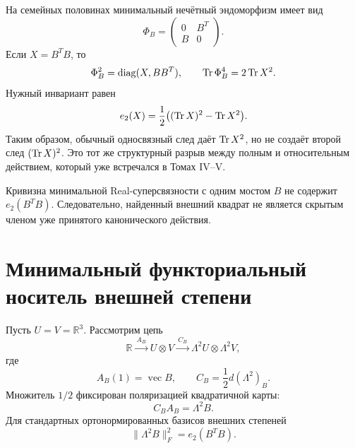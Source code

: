 На семейных половинах минимальный нечётный эндоморфизм имеет вид
\begin{equation}
 \Phi_B=
 \begin{pmatrix}0&B^T\\B&0\end{pmatrix}.
\end{equation}
Если $X=B^TB$, то
\begin{equation}
 \Phi_B^2=\operatorname{diag}(X,BB^T),
 \qquad
 \operatorname{Tr}\Phi_B^4=2\operatorname{Tr} X^2.
 \label{eq:v6-two-node-bridge-trace-four}
\end{equation}
Нужный инвариант равен
\begin{equation}
 e_2(X)=\frac12\bigl((\operatorname{Tr} X)^2-\operatorname{Tr} X^2\bigr).
\end{equation}
Таким образом, обычный односвязный след даёт $\operatorname{Tr} X^2$, но не создаёт
второй след $(\operatorname{Tr} X)^2$. Это тот же структурный разрыв между полным и
относительным действием, который уже встречался в Томах IV--V.

\begin{theorem}
Кривизна минимальной Real-суперсвязности с одним мостом $B$ не содержит
$e_2(B^TB)$. Следовательно, найденный внешний квадрат не является
скрытым членом уже принятого канонического действия.
\end{theorem}

\section{Минимальный функториальный носитель внешней степени}

Пусть $U=V=\mathbb R^3$. Рассмотрим цепь
\begin{equation}
 \mathbb R
 \xrightarrow{\ A_B\ }
 U\otimes V
 \xrightarrow{\ C_B\ }
 \Lambda^2U\otimes\Lambda^2V,
 \label{eq:v6-bridge-exterior-chain}
\end{equation}
где
\begin{equation}
 A_B(1)=\operatorname{vec}B,
 \qquad
 C_B=\frac12d(\Lambda^2)_B.
\end{equation}
Множитель $1/2$ фиксирован поляризацией квадратичной карты:
\begin{equation}
 C_BA_B=\Lambda^2B.
 \label{eq:v6-polarized-exterior-path}
\end{equation}
Для стандартных ортонормированных базисов внешних степеней
\begin{equation}
 \|\Lambda^2B\|_F^2=e_2(B^TB).
 \label{eq:v6-normalized-exterior-norm}
\end{equation}

